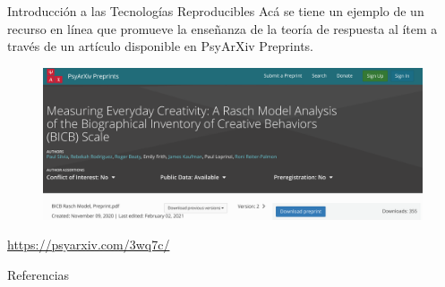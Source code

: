 \documentclass{beamer}
\begin{document}
\begin{frame}{Introducción a las Tecnologías Reproducibles}
Acá se tiene un ejemplo de un recurso en línea que promueve la enseñanza de la teoría de respuesta al ítem a través de un artículo disponible en PsyArXiv Preprints.
\begin{figure}
\includegraphics[width=1\textwidth]{Ejemplo.png}
\end{figure}
\textcolor{blue}{\url{https://psyarxiv.com/3wq7c/}}
\end{frame}

\begin{frame}[allowframebreaks]{Referencias}
\tiny

 
\end{frame}
\end{document}
